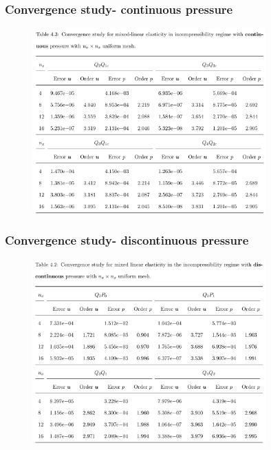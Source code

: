 \documentclass{beamer}
\begin{document}
\begin{frame}
	\frametitle{Convergence study- continuous pressure}

	\begin{figure} [h]
		\includegraphics[width=0.8\textwidth]{../figs/convergence-order-cont.png}
	\end{figure}

\end{frame}

\begin{frame}
	\frametitle{Convergence study- discontinuous pressure}

	\begin{figure} [h]
		\includegraphics[width=0.8\textwidth]{../figs/convergence-order-disc.png}
	\end{figure}

\end{frame}
\end{document}
